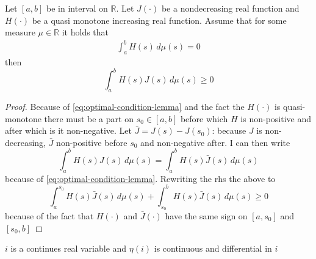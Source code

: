 \documentclass[10pt,a4paper]{article} 					%
\begin{document}
\begin{lemma}\label{lem:optimal-condition-lemma}
    Let \([a,b]\) be in interval on \(\mathbb{R}\). Let \(J(\cdot)\) be a nondecreasing real function and \(H(\cdot)\) be a quasi monotone increasing real function. Assume that for some measure \(\mu\in\mathbb{R}\) it holds that
	\begin{align}
	\int_a^b H(s)\, d\mu(s)=0\label{eq:optimal-condition-lemma}
	\end{align}
   then
   \[
    	\int_a^b H(s)J(s)\, d\mu(s)\ge0
   \]

\end{lemma}
\begin{proof}
	Because of \cref{eq:optimal-condition-lemma} and the fact the \(H(\cdot)\) is quasi-monotone there must be a part on \(s_0\in[a,b]\) before which \(H\) is non-positive and after which is it non-negative. Let \(\bar{J}=J(s)-J(s_0)\): because \(J\) is non-decreasing, \(\bar{J}\) non-positive before \(s_0\) and non-negative after. I can then write
	\[
		\int_a^b H(s)J(s)\, d\mu(s)=\int_a^b H(s)\bar{J}(s)\, d\mu(s)
	\]
because of \cref{eq:optimal-condition-lemma}. Rewriting the rhs the above to
\[
	\int_a^{s_0} H(s)\bar{J}(s)\, d\mu(s)+ \int_{s_0}^b H(s)\bar{J}(s)\, d\mu(s)\geq 0
\]
because of the fact that \(H(\cdot)\) and \(\bar{J}(\cdot)\) have the same sign on \([a,s_0]\) and \([s_0,b]\)
\end{proof}

\begin{assumption}
	\(i\) is a continues real variable and \(\eta(i)\) is continuous and differential in \(i\)
\end{assumption}
\end{document}
